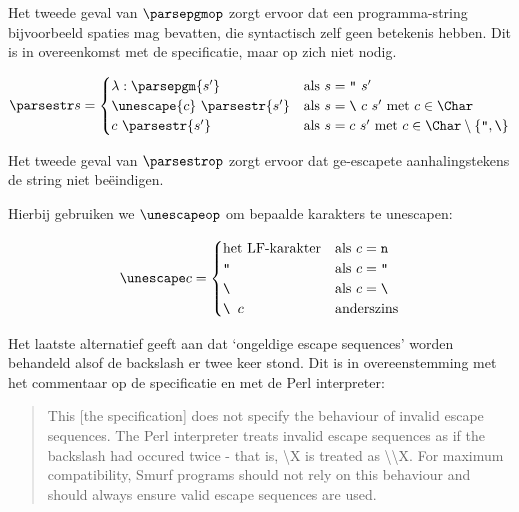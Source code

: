 Het tweede geval van $\parsepgmop$ zorgt ervoor dat een programma-string
bijvoorbeeld spaties mag bevatten, die syntactisch zelf geen betekenis hebben.
Dit is in overeenkomst met de specificatie, maar op zich niet nodig.

$$
	\parsestr s =
		\begin{cases}
			\lambda:\parsepgm{s'} & \text{als $s=\texttt{"}~s'$} \\
			\unescape{c}~\parsestr{s'} & \text{als $s=\texttt{\textbackslash}~c~s'$
				met $c \in\Char$} \\
			c~\parsestr{s'} & \text{als $s=c~s'$ met $c
				\in\Char\setminus\{\texttt{"},\texttt{\textbackslash}\}$}\\
		\end{cases}
$$

Het tweede geval van $\parsestrop$ zorgt ervoor dat ge-escapete
aanhalingstekens de string niet beëindigen.

Hierbij gebruiken we $\unescapeop$ om bepaalde karakters te unescapen:

$$
	\unescape c =
		\begin{cases}
			\text{het LF-karakter}      & \text{als $c=\texttt{n}$} \\
			\texttt{"}                  & \text{als $c=\texttt{"}$} \\
			\texttt{\textbackslash}     & \text{als $c=\texttt{\textbackslash}$} \\
			\texttt{\textbackslash~$c$} & \text{anderszins}
		\end{cases}
$$

Het laatste alternatief geeft aan dat `ongeldige escape sequences' worden
behandeld alsof de backslash er twee keer stond. Dit is in overeenstemming met
het commentaar op de specificatie en met de Perl interpreter: %
\begin{quote}
	This [the specification] does not specify the behaviour of invalid escape
	sequences. The Perl interpreter treats invalid escape sequences as if the
	backslash had occured twice - that is, \textbackslash X is treated as
	\textbackslash\textbackslash X. For maximum compatibility, Smurf programs
	should not rely on this behaviour and should always ensure valid escape
	sequences are used.
\end{quote}

